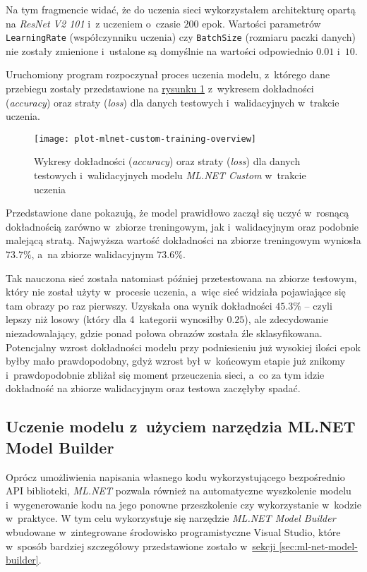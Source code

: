 Na tym fragmencie widać, że do uczenia sieci wykorzystałem architekturę opartą na \emph{ResNet V2 101} i~z uczeniem o~czasie $200$ epok.
Wartości parametrów \lstinline{LearningRate} (współczynniku uczenia) czy \lstinline{BatchSize} (rozmiaru paczki danych) nie zostały zmienione i~ustalone są domyślnie na wartości odpowiednio $0.01$ i~$10$.

Uruchomiony program rozpoczynał proces uczenia modelu, z~którego dane przebiegu zostały przedstawione na \hyperref[fig:plot-mlnet-custom-training-overview]{rysunku \ref*{fig:plot-mlnet-custom-training-overview}} z~wykresem dokładności (\emph{accuracy}) oraz straty (\emph{loss}) dla danych testowych i~walidacyjnych w~trakcie uczenia.

\begin{figure}[ht]
  \texttt{[image: plot-mlnet-custom-training-overview]}
  \caption[Wykresy statystyk modelu ML.NET Custom w~trakcie uczenia]{Wykresy dokładności (\emph{accuracy}) oraz straty (\emph{loss}) dla danych testowych i~walidacyjnych modelu \emph{ML.NET Custom} w~trakcie uczenia}
  \label{fig:plot-mlnet-custom-training-overview}
\end{figure}

Przedstawione dane pokazują, że model prawidłowo zaczął się uczyć w~rosnącą dokładnością zarówno w~zbiorze treningowym, jak i~walidacyjnym oraz podobnie malejącą stratą.
Najwyższa wartość dokładności na zbiorze treningowym wyniosła $73.7\%$, a~na zbiorze walidacyjnym $73.6\%$.

Tak nauczona sieć została natomiast później przetestowana na zbiorze testowym, który nie został użyty w~procesie uczenia, a~więc sieć widziała pojawiające się tam obrazy po raz pierwszy.
Uzyskała ona wynik dokładności $45.3\%$ -- czyli lepszy niż losowy (który dla 4~kategorii wynosiłby $0.25$), ale zdecydowanie niezadowalający, gdzie ponad połowa obrazów została źle sklasyfikowana.
Potencjalny wzrost dokładności modelu przy podniesieniu już wysokiej ilości epok byłby mało prawdopodobny, gdyż wzrost był w~końcowym etapie już znikomy i~prawdopodobnie zbliżał się moment przeuczenia sieci, a~co za tym idzie dokładność na zbiorze walidacyjnym oraz testowa zaczęłyby spadać.

\subsection{Uczenie modelu z~użyciem narzędzia ML.NET Model Builder}

Oprócz umożliwienia napisania własnego kodu wykorzystującego bezpośrednio API biblioteki, \emph{ML.NET} pozwala również na automatyczne wyszkolenie modelu i~wygenerowanie kodu na jego ponowne przeszkolenie czy wykorzystanie w~kodzie w~praktyce.
W tym celu wykorzystuje się narzędzie \emph{ML.NET Model Builder} wbudowane w~zintegrowane środowisko programistyczne Visual Studio, które w~sposób bardziej szczegółowy przedstawione zostało w~\hyperref[sec:ml-net-model-builder]{sekcji \ref*{sec:ml-net-model-builder}}.

